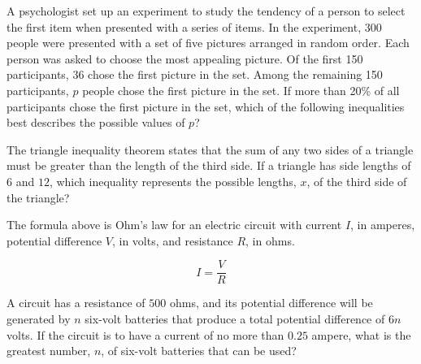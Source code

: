 \newpage

\noindent\markforreview

\vspace{1em}

A psychologist set up an experiment to study the tendency of a person to select the first item when presented with a series of items. In the experiment, 300 people were presented with a set of five pictures arranged in random order. Each person was asked to choose the most appealing picture. Of the first 150 participants, 36 chose the first picture in the set. Among the remaining 150 participants, $p$ people chose the first picture in the set. If more than 20\% of all participants chose the first picture in the set, which of the following inequalities best describes the possible values of $p$?

\vspace{0.75em}


\vspace{2em}

\noindent\markforreview

\vspace{1em}

The triangle inequality theorem states that the sum of any two sides of a triangle must be greater than the length of the third side. If a triangle has side lengths of $6$ and $12$, which inequality represents the possible lengths, $x$, of the third side of the triangle?

\vspace{0.75em}


\newpage
\noindent\markforreview

\vspace{1em}

The formula above is Ohm’s law for an electric circuit with current $I$, in amperes, potential difference $V$, in volts, and resistance $R$, in ohms.

\[
I = \frac{V}{R}
\]

A circuit has a resistance of $500$ ohms, and its potential difference will be generated by $n$ six-volt batteries that produce a total potential difference of $6n$ volts. If the circuit is to have a current of no more than $0.25$ ampere, what is the greatest number, $n$, of six-volt batteries that can be used?
\newpage

